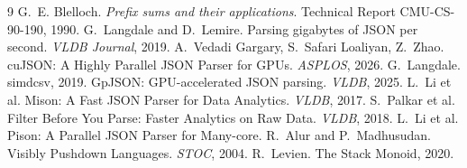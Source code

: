 \documentclass[11pt]{article}
\begin{document}
\begin{thebibliography}{9}
 G.~E. Blelloch. \emph{Prefix sums and their applications}.
  Technical Report CMU-CS-90-190, 1990.
 G.~Langdale and D.~Lemire. Parsing gigabytes of JSON per
  second. \emph{VLDB Journal}, 2019.
 A.~Vedadi Gargary, S.~Safari Loaliyan, Z.~Zhao. cuJSON: A Highly
  Parallel JSON Parser for GPUs. \emph{ASPLOS}, 2026.
 G.~Langdale. simdcsv, 2019.
 GpJSON: GPU-accelerated JSON parsing. \emph{VLDB}, 2025.
 L.~Li et al. Mison: A Fast JSON Parser for Data Analytics.
  \emph{VLDB}, 2017.
 S.~Palkar et al. Filter Before You Parse: Faster Analytics on
  Raw Data. \emph{VLDB}, 2018.
 L.~Li et al. Pison: A Parallel JSON Parser for Many-core.
 R.~Alur and P.~Madhusudan. Visibly Pushdown Languages.
  \emph{STOC}, 2004.
 R.~Levien. The Stack Monoid, 2020.
\end{thebibliography}
\end{document}
